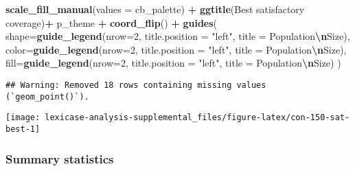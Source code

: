 \documentclass[
]{book}
\newenvironment{Shaded}{\begin{snugshade}}{\end{snugshade}}
\newcommand{\AttributeTok}[1]{\textcolor[rgb]{0.13,0.29,0.53}{#1}}
\newcommand{\DecValTok}[1]{\textcolor[rgb]{0.00,0.00,0.81}{#1}}
\newcommand{\FunctionTok}[1]{\textcolor[rgb]{0.13,0.29,0.53}{\textbf{#1}}}
\newcommand{\NormalTok}[1]{#1}
\newcommand{\SpecialCharTok}[1]{\textcolor[rgb]{0.81,0.36,0.00}{\textbf{#1}}}
\newcommand{\StringTok}[1]{\textcolor[rgb]{0.31,0.60,0.02}{#1}}
\begin{document}
\begin{Shaded}
\begin{Highlighting}[]
  \FunctionTok{scale\_fill\_manual}\NormalTok{(}\AttributeTok{values =}\NormalTok{ cb\_palette) }\SpecialCharTok{+}
  \FunctionTok{ggtitle}\NormalTok{(}\StringTok{\textquotesingle{}Best satisfactory coverage\textquotesingle{}}\NormalTok{)}\SpecialCharTok{+}
\NormalTok{  p\_theme }\SpecialCharTok{+} \FunctionTok{coord\_flip}\NormalTok{() }\SpecialCharTok{+}
  \FunctionTok{guides}\NormalTok{(}
    \AttributeTok{shape=}\FunctionTok{guide\_legend}\NormalTok{(}\AttributeTok{nrow=}\DecValTok{2}\NormalTok{, }\AttributeTok{title.position =} \StringTok{"left"}\NormalTok{, }\AttributeTok{title =} \StringTok{\textquotesingle{}Population}\SpecialCharTok{\textbackslash{}n}\StringTok{Size\textquotesingle{}}\NormalTok{),}
    \AttributeTok{color=}\FunctionTok{guide\_legend}\NormalTok{(}\AttributeTok{nrow=}\DecValTok{2}\NormalTok{, }\AttributeTok{title.position =} \StringTok{"left"}\NormalTok{, }\AttributeTok{title =} \StringTok{\textquotesingle{}Population}\SpecialCharTok{\textbackslash{}n}\StringTok{Size\textquotesingle{}}\NormalTok{),}
    \AttributeTok{fill=}\FunctionTok{guide\_legend}\NormalTok{(}\AttributeTok{nrow=}\DecValTok{2}\NormalTok{, }\AttributeTok{title.position =} \StringTok{"left"}\NormalTok{, }\AttributeTok{title =} \StringTok{\textquotesingle{}Population}\SpecialCharTok{\textbackslash{}n}\StringTok{Size\textquotesingle{}}\NormalTok{)}
\NormalTok{  )}
\end{Highlighting}
\end{Shaded}

\begin{verbatim}
## Warning: Removed 18 rows containing missing values (`geom_point()`).
\end{verbatim}

\texttt{[image: lexicase-analysis-supplemental\_files/figure-latex/con-150-sat-best-1]}

\hypertarget{summary-statistics-2}{%
\subsubsection{Summary statistics}\label{summary-statistics-2}}
\end{document}
